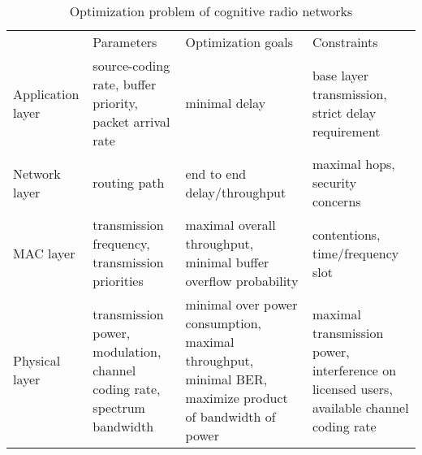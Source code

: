 \begin{sidewaystable}
\centering
\begin{tabular}{|L{4cm}|C{5cm}|C{5cm}|C{5cm}|}
\hline 
 & Parameters & Optimization goals & Constraints \\ 
\hhline{|=|=|=|=|}
Application layer & source-coding rate, buffer priority, packet arrival rate & minimal delay & base layer transmission, strict delay requirement \\ 
\hline 
Network layer & routing path & end to end delay/throughput & maximal hops, security concerns \\ 
\hline 
MAC layer & transmission frequency, transmission priorities & maximal overall throughput, minimal buffer overflow probability & contentions, time/frequency slot \\ 
\hline
Physical layer & transmission power, modulation, channel coding rate, spectrum bandwidth & minimal over power consumption, maximal throughput, minimal BER, maximize product of bandwidth of power~\cite{tachwali_opt_bandwidth_power_2013} & maximal transmission power, interference on licensed users, available channel coding rate \\ 
\hline
\end{tabular} 
\caption{Optimization problem of cognitive radio networks}
\label{opt_table} 
\end{sidewaystable}




